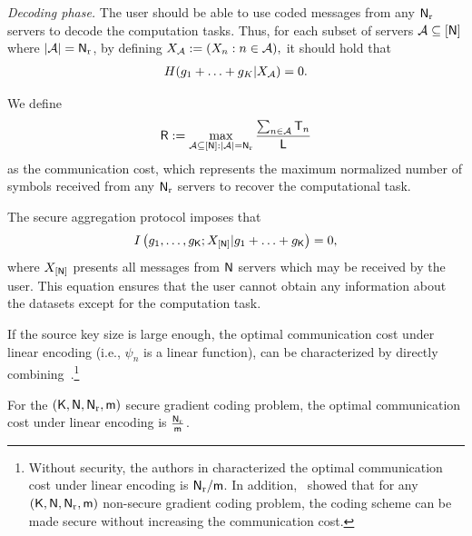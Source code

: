 \documentclass[conference,letterpaper]{IEEEtran}
\begin{document}
{\it Decoding phase.}
The user should be able to use coded messages from any ${\sf N}_{\rm r}$  servers to decode the computation tasks. 
Thus, for each subset of servers ${\cal A} \subseteq [{\sf N}]$ where $|{\cal A}| = {\sf N}_{\rm r}$, by defining
$
    {X_{{\cal A}}}: = ( {X_n}:n \in {\cal A}), 
$
it should hold that
\begin{align}
    H(g_1+\ldots+g_K | X_{{\cal A}}) = 0.
\end{align}

We define 
\begin{equation}
    {\sf R}: = \mathop {\max }\limits_{{\cal A} \subseteq [{\sf N}]:|{\cal A}| = {{\sf N}_{\rm r}}} \frac{{\sum\nolimits_{n \in {\cal A}} {{{\sf T}_n}} }}{{\sf L}}
\end{equation} 
as the communication cost, which represents the maximum normalized number of symbols received from any ${\sf N}_{\rm r}$ servers to recover the computational task.

The secure aggregation protocol imposes that  
\begin{align}
    I\left(g_{1},\ldots, g_{{\sf K}};   X_{[{\sf N}]} | g_1+\ldots+g_{{\sf K}}  \right) = 0, \label{eq:security}
\end{align}
where $X_{[{\sf N}]}$ presents all messages from ${\sf N}$ servers which may be received by the user. This equation ensures that the user cannot obtain any information about the datasets except for the computation task.

If the source key size is large enough, the optimal communication cost under linear encoding (i.e., $ \psi_n$ is a linear function), can be characterized by directly combining~\cite{wan2022secure,ye2018communication}.\footnote{\label{foot:direct optimal}Without security, the authors in \cite{ye2018communication} characterized the optimal communication cost under linear encoding is ${\sf N}_{\rm r}/{\sf m}$. In addition,~\cite[Theorem 1]{wan2022secure} showed that for any $({\sf K}, {\sf N}, {\sf N}_{\rm r}, {\sf m})$ non-secure gradient coding problem, the coding scheme can be made secure without increasing the communication cost.} 
\begin{thm}
\label{thm:communication cost}
For the  $({\sf K},{\sf N},{\sf N}_{\rm r}, {\sf m})$ secure gradient coding problem, the optimal communication cost under linear encoding is 
$ \frac{{\sf N}_{\rm r}}{{\sf m}}$.
\end{thm}
\end{document}

